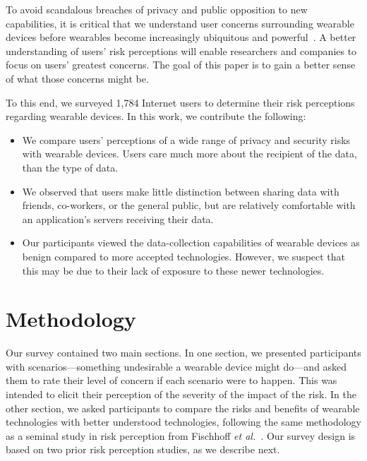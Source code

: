 \documentclass{acm_proc_article-sp}
\def\etal{{\it et al.~}}
\begin{document}
To avoid scandalous breaches of privacy and public opposition to new capabilities, it is critical that we understand user concerns surrounding wearable devices before wearables become increasingly ubiquitous and powerful~\cite{Implants}. A better understanding of users' risk perceptions will enable researchers and companies to focus on users' greatest concerns. The goal of this paper is to gain a better sense of what those concerns might be. 

To this end, we surveyed 1,784 Internet users to determine their risk perceptions regarding wearable devices. In this work, we contribute the following: \\[-0.8cm]

\begin{itemize} \itemsep1pt \parskip0pt 
\item We compare users' perceptions of a wide range of privacy and security risks with wearable devices. Users care much more about the recipient of the data, than the type of data.
\item We observed that users make little distinction between sharing data with friends, co-workers, or the general public, but are relatively comfortable with an application's servers receiving their data.
\item Our participants viewed the data-collection capabilities of wearable devices as benign compared to more accepted technologies. However, we suspect that this may be due to their lack of exposure to these newer technologies.
\end{itemize}


\section{Methodology}

Our survey contained two main sections.
In one section, we presented participants with scenarios---something undesirable a wearable device might do---and asked them to rate their level of concern if each scenario were to happen.
This was intended to elicit their perception of the severity of the impact of the risk.
In the other section, we asked participants to compare the risks and benefits of wearable technologies with better understood technologies, following the same methodology as a seminal study in risk perception from Fischhoff \etal \cite{Fischhoff}.
Our survey design is based on two prior risk perception studies, as we describe next.
\end{document}
